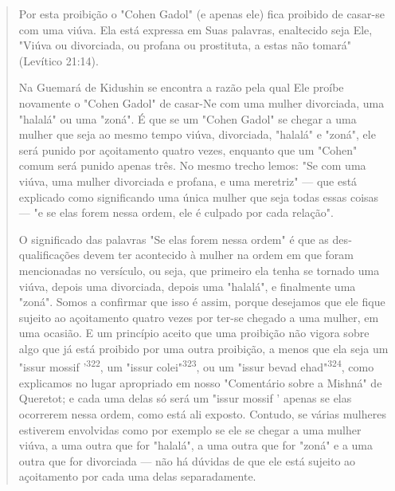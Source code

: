 \begin{quote}
Por esta proibição o "Cohen Gadol" (e apenas ele) fica proibido de
ca­sar-se com uma viúva. Ela está expressa em Suas palavras, enaltecido
seja Ele, "Viúva ou divorciada, ou profana ou prostituta, a estas não
tomará" (Levítico 21:14).

Na Guemará de Kidushin se encontra a razão pela qual Ele proíbe
novamente o "Cohen Gadol" de casar-Ne com uma mulher divorciada, uma
"ha­lalá" ou uma "zoná". É que se um "Cohen Gadol" se chegar a uma
mulher que seja ao mesmo tempo viúva, divorciada, "halalá" e "zoná", ele
será puni­do por açoitamento quatro vezes, enquanto que um "Cohen" comum
será pu­nido apenas três. No mesmo trecho lemos: "Se com uma viúva, uma
mulher divorciada e profana, e uma meretriz" --- que está explicado como
significan­do uma única mulher que seja todas essas coisas --- "e se
elas forem nessa or­dem, ele é culpado por cada relação".

O significado das palavras "Se elas forem nessa ordem" é que as
des­qualificações devem ter acontecido à mulher na ordem em que foram
mencio­nadas no versículo, ou seja, que primeiro ela tenha se tornado
uma viúva, de­pois uma divorciada, depois uma "halalá", e finalmente uma
"zoná". Somos a confirmar que isso é assim, porque desejamos que ele
fique sujeito ao açoita­mento quatro vezes por ter-se chegado a uma
mulher, em uma ocasião. E um princípio aceito que uma proibição não
vigora sobre algo que já está proibido por uma outra proibição, a menos
que ela seja um "issur mossif '\textsuperscript{322}, um "is­sur
colei"\textsuperscript{323}, ou um "issur bevad
ehad"\textsuperscript{324}, como explicamos no lugar apro­priado em
nosso "Comentário sobre a Mishná" de Queretot; e cada uma delas só será
um "issur mossif ' apenas se elas ocorrerem nessa ordem, como está ali
exposto. Contudo, se várias mulheres estiverem envolvidas como por
exemplo se ele se chegar a uma mulher viúva, a uma outra que for
"halalá", a uma outra que for "zoná" e a uma outra que for divorciada
--- não há dúvidas de que ele está sujeito ao açoitamento por cada uma
delas separadamente.


\end{quote}
